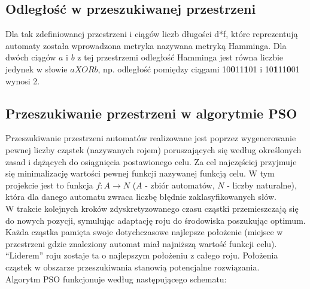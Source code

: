 \documentclass[runningheads,a4paper]{llncs}
\begin{document}
\subsection{Odległość w przeszukiwanej przestrzeni}

Dla tak zdefiniowanej przestrzeni i ciągów liczb długości d*f, które reprezentują automaty została wprowadzona metryka nazywana metryką Hamminga. Dla dwóch ciągów $a$ i $b$ z tej przestrzemi odległość Hamminga jest równa liczbie jedynek w słowie $a XOR b$, np. odległość pomiędzy ciągami 10\textbf{0}11\textbf{1}01 i 10\textbf{1}11\textbf{0}01 wynosi 2.

\subsection{Przeszukiwanie przestrzeni w algorytmie PSO}

Przeszukiwanie przestrzeni automatów realizowane jest poprzez wygenerowanie pewnej liczby cząstek (nazywanych rojem) poruszających się według określonych zasad i dążących do osiągnięcia postawionego celu. Za cel najczęściej przyjmuje się minimalizację wartości pewnej funkcji nazywanej funkcją celu. W tym projekcie jest to funkcja $f:A \rightarrow N$ ($A$ - zbiór automatów, $N$ - liczby naturalne), która dla danego automatu zwraca liczbę błędnie zaklasyfikowanych słów.\\

W trakcie kolejnych kroków zdyskretyzowanego czasu cząstki przemieszczają się do nowych pozycji, symulując adaptację roju do środowiska poszukując optimum. Każda cząstka pamięta swoje dotychczasowe najlepsze położenie (miejsce w przestrzeni gdzie znaleziony automat miał najniższą wartość funkcji celu). “Liderem” roju zostaje ta o najlepszym położeniu z całego roju. Położenia cząstek w obszarze przeszukiwania stanowią potencjalne rozwiązania. \\

Algorytm PSO funkcjonuje według następującego schematu:
\end{document}
